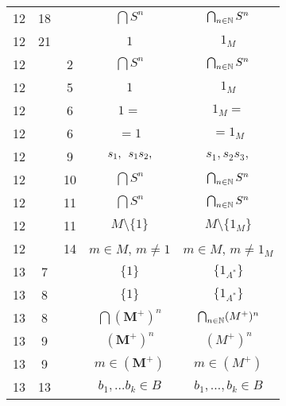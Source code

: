 \documentclass[a4paper,11pt]{article}
\begin{document}
\begin{center}
\begin{tabular}{|c|c|c|c|c|}
    12 & 18 & & $\bigcap S^{ n }$ & $\bigcap_{ n \in \mathbb{N} } S^{ n }$ \\
    12 & 21 & & $1$ & $1_{ M }$ \\
    12 & &  2 & $\bigcap S^{ n }$ & $\bigcap_{ n \in \mathbb{N} } S^{ n }$ \\
    12 & &  5 & $1$ & $1_{ M }$ \\
    12 & &  6 & $1 =$ & $1_{ M } =$ \\
    12 & &  6 & $= 1$ & $= 1_{ M }$ \\
    12 & &  9 & $s_{ 1 }, \hspace{0.5em} s_{ 1 } s_{ 2 },$
           & $s_{ 1 }, s_{ 2 } s_{ 3 },$ \\
    12 & & 10 & $\bigcap S^{ n }$ & $\bigcap_{ n \in \mathbb{N} } S^{ n }$ \\
    12 & & 11 & $\bigcap S^{ n }$ & $\bigcap_{ n \in \mathbb{N} } S^{ n }$  \\
    12 & & 11 & $M \setminus \{ 1 \} $ & $M \setminus \{ 1_{ M } \} $ \\
    12 & & 14 & $m \in M$,{ } $m \neq 1$ & $m \in M$, $m \neq 1_{ M }$ \\
    13 &  7 & & $\{ 1 \}$ & $\{ 1_{ A^{ * } } \}$ \\
    13 &  8 & & $\{ 1 \}$ & $\{ 1_{ A^{ * } } \}$ \\
    13 &  8 & & $\bigcap ( \mathbf{M}^{ + } )^{ n }$
           & $\bigcap_{ n \in \mathbb{N} } ( M^{ + } )^{ n }$ \\
    13 &  9 & & $( \mathbf{M}^{ + } )^{ n }$ & $( M^{ + } )^{ n }$ \\
    13 &  9 & & $m \in ( \mathbf{M}^{ + } )$ & $m \in ( M^{ + } )$ \\
    13 & 13 & & $b_{ 1 }, \ldots b_{ k } \in B$ & $b_{ 1 }, \ldots, b_{ k } \in B$ \\
    \hline
  \end{tabular}





  \newpage


\end{center}
\end{document}
